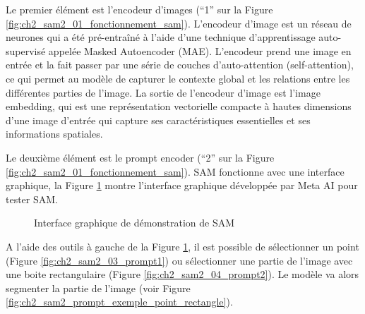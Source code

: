Le premier élément est l'encodeur d'images (``1'' sur la Figure \ref{fig:ch2_sam2_01_fonctionnement_sam}). L'encodeur d'image est un réseau de neurones qui a été pré-entraîné à l'aide d'une technique d'apprentissage auto-supervisé appelée Masked Autoencoder (MAE). L'encodeur prend une image en entrée et la fait passer par une série de couches d'auto-attention (self-attention), ce qui permet au modèle de capturer le contexte global et les relations entre les différentes parties de l'image. La sortie de l'encodeur d'image est l'image embedding, qui est une représentation vectorielle compacte à hautes dimensions d'une image d'entrée qui capture ses caractéristiques essentielles et ses informations spatiales.

Le deuxième élément est le prompt encoder (``2'' sur la Figure \ref{fig:ch2_sam2_01_fonctionnement_sam}). SAM fonctionne avec une interface graphique, la Figure \ref{fig:ch2_sam2_02_prompt_encoder} 
montre l'interface graphique développée par Meta AI pour tester SAM.

\begin{figure}[H]
    \centering
    \caption{Interface graphique de démonstration de SAM \cite{fair_segment_nodate}}
    \label{fig:ch2_sam2_02_prompt_encoder}
\end{figure}

A l’aide des outils à gauche de la Figure \ref{fig:ch2_sam2_02_prompt_encoder}, il est possible de sélectionner un point (Figure \ref{fig:ch2_sam2_03_prompt1}) ou sélectionner une partie de l’image avec une boite rectangulaire (Figure \ref{fig:ch2_sam2_04_prompt2}). Le modèle va alors segmenter la partie de l’image (voir Figure \ref{fig:ch2_sam2_prompt_exemple_point_rectangle}).

